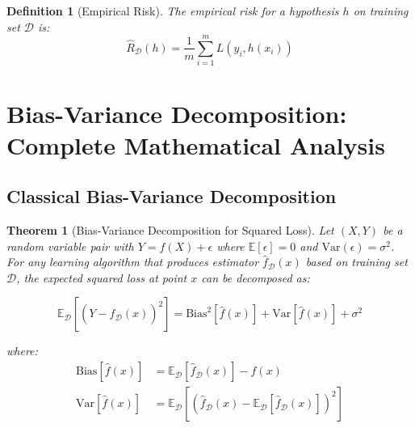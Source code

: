 \documentclass[12pt, a4paper]{article}
\newtheorem{theorem}{Theorem}
\newtheorem{definition}{Definition}
\begin{document}
\begin{definition}[Empirical Risk]
The empirical risk for a hypothesis $h$ on training set $\mathcal{D}$ is:
\begin{equation}
\hat{R}_{\mathcal{D}}(h) = \frac{1}{m} \sum_{i=1}^m L(y_i, h(x_i))
\end{equation}
\end{definition}

\section{Bias-Variance Decomposition: Complete Mathematical Analysis}

\subsection{Classical Bias-Variance Decomposition}

\begin{theorem}[Bias-Variance Decomposition for Squared Loss]
Let $(X,Y)$ be a random variable pair with $Y = f(X) + \epsilon$ where $\mathbb{E}[\epsilon] = 0$ and $\text{Var}(\epsilon) = \sigma^2$. For any learning algorithm that produces estimator $\hat{f}_{\mathcal{D}}(x)$ based on training set $\mathcal{D}$, the expected squared loss at point $x$ can be decomposed as:

\begin{equation}
\mathbb{E}_{\mathcal{D}}[(Y - \hat{f}_{\mathcal{D}}(x))^2] = \text{Bias}^2[\hat{f}(x)] + \text{Var}[\hat{f}(x)] + \sigma^2
\end{equation}

where:
\begin{align}
\text{Bias}[\hat{f}(x)] &= \mathbb{E}_{\mathcal{D}}[\hat{f}_{\mathcal{D}}(x)] - f(x) \\
\text{Var}[\hat{f}(x)] &= \mathbb{E}_{\mathcal{D}}[(\hat{f}_{\mathcal{D}}(x) - \mathbb{E}_{\mathcal{D}}[\hat{f}_{\mathcal{D}}(x)])^2]
\end{align}
\end{theorem}
\end{document}

